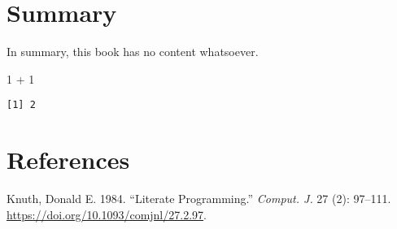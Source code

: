 \documentclass[
  letterpaper,
  DIV=11,
  numbers=noendperiod]{scrreprt}
\newenvironment{Shaded}{\begin{snugshade}}{\end{snugshade}}
\newcommand{\DecValTok}[1]{\textcolor[rgb]{0.68,0.00,0.00}{#1}}
\newcommand{\SpecialCharTok}[1]{\textcolor[rgb]{0.37,0.37,0.37}{#1}}
\newlength{\cslhangindent}
\newenvironment{CSLReferences}[2] %
 {\begin{list}{}{%
  \setlength{\itemindent}{0pt}
  \setlength{\leftmargin}{0pt}
  \setlength{\parsep}{0pt}
  \ifodd #1
   \setlength{\leftmargin}{\cslhangindent}
   \setlength{\itemindent}{-1\cslhangindent}
  \fi
  \setlength{\itemsep}{#2\baselineskip}}}
 {\end{list}}
\begin{document}


\chapter{Summary}\label{summary}

In summary, this book has no content whatsoever.

\begin{Shaded}
\begin{Highlighting}[]
\DecValTok{1} \SpecialCharTok{+} \DecValTok{1}
\end{Highlighting}
\end{Shaded}

\begin{verbatim}
[1] 2
\end{verbatim}


\chapter*{References}\label{references}


\label{refs}
\begin{CSLReferences}{1}{0}
Knuth, Donald E. 1984. {``Literate Programming.''} \emph{Comput. J.} 27
(2): 97--111. \url{https://doi.org/10.1093/comjnl/27.2.97}.

\end{CSLReferences}
\end{document}
